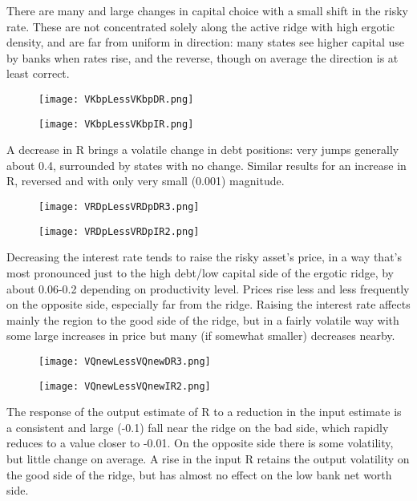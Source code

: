 \documentclass[english]{article}
\begin{document}
There are many and large changes in capital choice with a small shift in the risky rate. These are not 
concentrated solely along the active ridge with high ergotic density, and are far from uniform in direction:
many states see higher capital use by banks when rates rise, and the reverse, though on average the 
direction is at least correct. 

\begin{figure}[H]
\centering
		\texttt{[image: VKbpLessVKbpDR.png]}
\end{figure}
\begin{figure}[H]
\centering
		\texttt{[image: VKbpLessVKbpIR.png]}
\end{figure}

A decrease in R brings a volatile change in debt positions: very jumps generally about 0.4, surrounded by states with no change. Similar results for an increase in R, reversed and with only very small (0.001) magnitude.

\begin{figure}[H]
\centering
		\texttt{[image: VRDpLessVRDpDR3.png]}
\end{figure}
\begin{figure}[H]
\centering
		\texttt{[image: VRDpLessVRDpIR2.png]}
\end{figure}

Decreasing the interest rate tends to raise the risky asset's price, in a way that's most pronounced just 
to the high debt/low capital side of the ergotic ridge, by about 0.06-0.2 depending on productivity level. 
Prices rise less and less frequently on the opposite side, especially far from the ridge. Raising the interest 
rate affects mainly the region to the good side of the ridge, but in a fairly volatile way with some large increases 
in price but many (if somewhat smaller) decreases nearby.

\begin{figure}[H]
\centering
		\texttt{[image: VQnewLessVQnewDR3.png]}
\end{figure}
\begin{figure}[H]
\centering
		\texttt{[image: VQnewLessVQnewIR2.png]}
\end{figure}

The response of the output estimate of R to a reduction in the input estimate is a consistent and 
large (-0.1) fall near the ridge on the bad side, which rapidly reduces to a value closer to -0.01. On the 
opposite side there is some volatility, but little change on average. A rise in the input R retains the 
output volatility on the good side of the ridge, but has almost no effect on the low bank net worth side.
\end{document}
